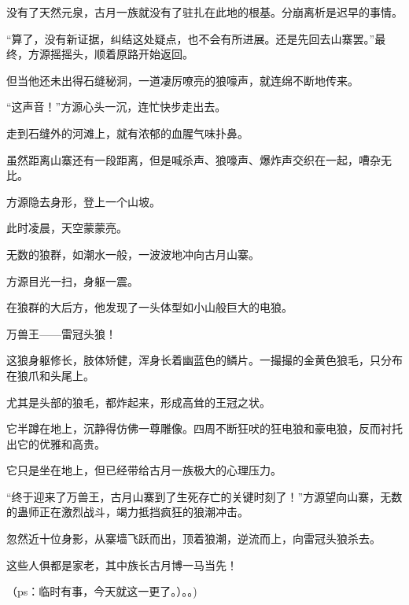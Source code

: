 \begin{this_body}
没有了天然元泉，古月一族就没有了驻扎在此地的根基。分崩离析是迟早的事情。

“算了，没有新证据，纠结这处疑点，也不会有所进展。还是先回去山寨罢。”最终，方源摇摇头，顺着原路开始返回。

但当他还未出得石缝秘洞，一道凄厉嘹亮的狼嚎声，就连绵不断地传来。

“这声音！”方源心头一沉，连忙快步走出去。

走到石缝外的河滩上，就有浓郁的血腥气味扑鼻。

虽然距离山寨还有一段距离，但是喊杀声、狼嚎声、爆炸声交织在一起，嘈杂无比。

方源隐去身形，登上一个山坡。

此时凌晨，天空蒙蒙亮。

无数的狼群，如潮水一般，一波波地冲向古月山寨。

方源目光一扫，身躯一震。

在狼群的大后方，他发现了一头体型如小山般巨大的电狼。

万兽王——雷冠头狼！

这狼身躯修长，肢体矫健，浑身长着幽蓝色的鳞片。一撮撮的金黄色狼毛，只分布在狼爪和头尾上。

尤其是头部的狼毛，都炸起来，形成高耸的王冠之状。

它半蹲在地上，沉静得仿佛一尊雕像。四周不断狂吠的狂电狼和豪电狼，反而衬托出它的优雅和高贵。

它只是坐在地上，但已经带给古月一族极大的心理压力。

“终于迎来了万兽王，古月山寨到了生死存亡的关键时刻了！”方源望向山寨，无数的蛊师正在激烈战斗，竭力抵挡疯狂的狼潮冲击。

忽然近十位身影，从寨墙飞跃而出，顶着狼潮，逆流而上，向雷冠头狼杀去。

这些人俱都是家老，其中族长古月博一马当先！

（ps：临时有事，今天就这一更了。）。。)

\end{this_body}


